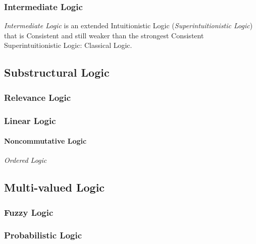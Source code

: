 \subsubsection{Intermediate Logic}

\emph{Intermediate Logic} is an extended Intuitionistic Logic
(\emph{Superintuitionistic Logic}) that is Consistent and still weaker
than the strongest Consistent Superintuitionistic Logic: Classical
Logic.

\subsection{Substructural Logic}\label{sec:substructural_logic}

\subsubsection{Relevance Logic}\label{sec:relevance_logic}

\subsubsection{Linear Logic}\label{sec:linear_logic}

\paragraph{Noncommutative Logic}\label{sec:noncommutative_logic}

\emph{Ordered Logic}



\subsection{Multi-valued Logic} \label{sec:multi_valued_logic}

\subsubsection{Fuzzy Logic}

\subsubsection{Probabilistic Logic}




